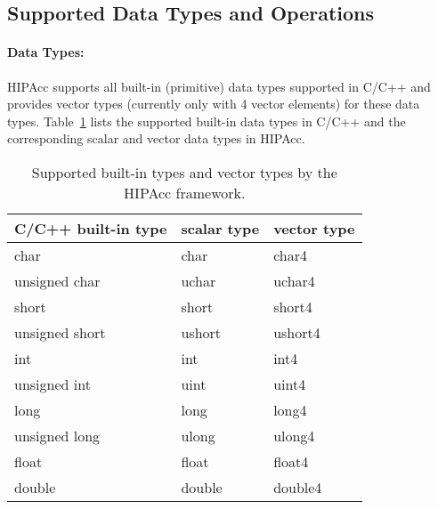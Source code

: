 %
%
\subsection{Supported Data Types and Operations}\label{sec:data:types:operations}

\paragraph{Data Types:}
\ac{HIPAcc} supports all built-in (primitive) data types supported in C/C++ and
provides vector types (currently only with 4 vector elements) for these data
types. Table~\ref{tab:types} lists the supported built-in data types in C/C++
and the corresponding scalar and vector data types in \ac{HIPAcc}.


\begin{table}
    \centering
    \begin{tabular}{lll}
\hline
C/C++ built-in type \qquad & scalar type \qquad & vector type \\
\hline
char                & char          & char4 \\
unsigned char       & uchar         & uchar4 \\
short               & short         & short4 \\
unsigned short      & ushort        & ushort4 \\
int                 & int           & int4 \\
unsigned int        & uint          & uint4 \\
long                & long          & long4 \\
unsigned long       & ulong         & ulong4 \\
float               & float         & float4 \\
double              & double        & double4 \\
\hline
    \end{tabular}
    \caption{Supported built-in types and vector types by the \ac{HIPAcc}
    framework.}\label{tab:types}
\end{table}



